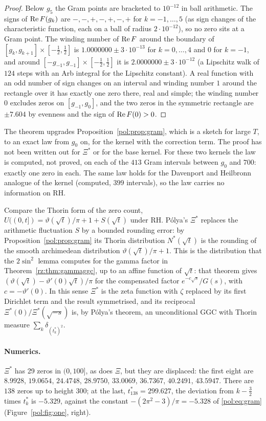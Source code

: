 \begin{proof}
Below $g_5$ the Gram points are bracketed to $10^{-12}$ in ball arithmetic. The signs of $\operatorname{Re} F(g_k)$ are $-,-,+,-,+,-,+$ for $k=-1,\dots,5$ (as sign changes of the characteristic function, each on a ball of radius $2\cdot10^{-12}$), so no zero sits at a Gram point. The winding number of $\operatorname{Re} F$ around the boundary of $[g_k,g_{k+1}]\times[-\frac12,\frac12]$ is $1.0000000\pm3\cdot10^{-13}$ for $k=0,\dots,4$ and $0$ for $k=-1$, and around $[-g_{-1},g_{-1}]\times[-\frac12,\frac12]$ it is $2.0000000\pm3\cdot10^{-12}$ (a Lipschitz walk of $124$ steps with an Arb integral for the Lipschitz constant). A real function with an odd number of sign changes on an interval and winding number $1$ around the rectangle over it has exactly one zero there, real and simple; the winding number $0$ excludes zeros on $[g_{-1},g_0]$, and the two zeros in the symmetric rectangle are $\pm7.604$ by evenness and the sign of $\operatorname{Re} F(0)>0$.
\end{proof}

The theorem upgrades Proposition~\ref{pol:prop:gram}, which is a sketch for large $T$, to an exact law from $g_0$ on, for the kernel with the correction term. The proof has not been written out for $\Xi^*$ or for the base kernel. For these two kernels the law is computed, not proved, on each of the $413$ Gram intervals between $g_0$ and $700$: exactly one zero in each. The same law holds for the Davenport and Heilbronn analogue of the kernel (computed, $399$ intervals), so the law carries no information on RH.

Compare the Thorin form of the zero count, $U((0,t])=\vartheta(\sqrt t)/\pi+1+S(\sqrt t)$ under RH. P\'olya's $\Xi^*$ replaces the arithmetic fluctuation $S$ by a bounded rounding error: by Proposition~\ref{pol:prop:gram} its Thorin distribution $N^*(\sqrt t)$ is the rounding of the smooth archimedean distribution $\vartheta(\sqrt t)/\pi+1$. This is the distribution that the $2\sin^2$ lemma computes for the gamma factor in Theorem~\ref{rz:thm:gammaggc}, up to an affine function of $\sqrt t$: that theorem gives $(\vartheta(\sqrt t)-\vartheta'(0)\sqrt t)/\pi$ for the compensated factor $e^{-c\sqrt s}/G(s)$, with $c=-\vartheta'(0)$. In this sense $\Xi^*$ is the zeta function with $\zeta$ replaced by its first Dirichlet term and the result symmetrised, and its reciprocal $\Xi^*(0)/\Xi^*(\sqrt{-s})$ is, by P\'olya's theorem, an unconditional GGC with Thorin measure $\sum_k\delta_{(t_k^*)^2}$.

\paragraph{Numerics.} $\Xi^*$ has 29 zeros in $(0,100]$, as does $\Xi$, but they are displaced: the first eight are $8.9928$, $19.0654$, $24.4748$, $28.9750$, $33.0069$, $36.7367$, $40.2491$, $43.5947$. There are $138$ zeros up to height $300$; at the last, $t^*_{138}=299.627$, the deviation from $k-\frac32$ times $t^*_k$ is $-5.329$, against the constant $-(2\pi^2-3)/\pi=-5.328$ of \eqref{pol:eq:gram} (Figure~\ref{pol:fig:one}, right).

